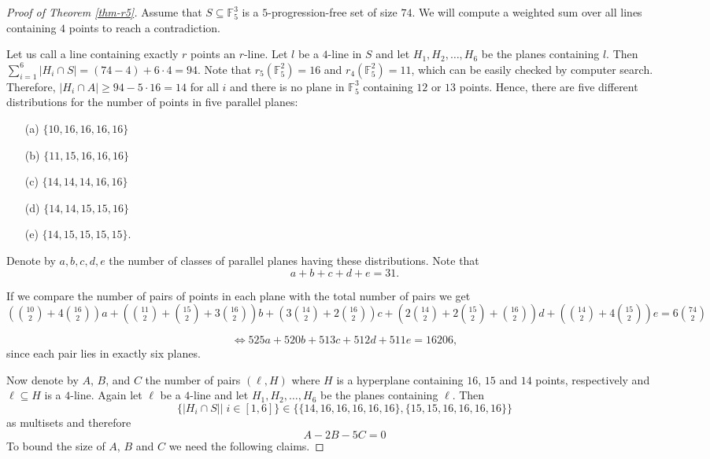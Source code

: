\documentclass[12pt]{amsart}
\newcommand{\<}{\langle}
\renewcommand{\>}{\rangle}
\numberwithin{equation}{section}
\numberwithin{theorem}{section}
\begin{document}
\begin{proof}[Proof of Theorem \ref{thm-r5}]
Assume that $S\subseteq \mathbb{F}_5^3$ is a $5$-progression-free set of size $74$. We will compute a weighted sum over all lines containing $4$ points to reach a contradiction.

Let us call a line containing exactly $r$ points an $r$-line. Let $l$ be a $4$-line in $S$ and let $H_1,H_2,\dots,H_6$ be the planes containing $l$. Then $\sum_{i=1}^6|H_i\cap S|=(74-4)+6\cdot 4=94$. Note that $r_5(\mathbb{F}_5^2)=16$ and $r_4(\mathbb{F}_5^2)=11$, which can be easily checked by computer search. Therefore, $|H_i\cap A|\geq 94-5\cdot 16=14$ for all $i$ and there is no plane in $\mathbb{F}_5^3$ containing $12$ or $13$ points.
Hence, there are five different distributions for the number of points in five parallel planes:
\begin{itemize}
    \item [(a)]$\{10,16,16,16,16\}$
    \item [(b)]$\{11,15,16,16,16\}$
    \item [(c)]$\{14,14,14,16,16\}$
    \item [(d)]$\{14,14,15,15,16\}$
    \item [(e)]$\{14,15,15,15,15\}.$
\end{itemize}
Denote by $a,b,c,d,e$ the number of classes of parallel planes having these distributions. Note that 
\begin{equation}\label{eq-sum}
a+b+c+d+e=31.
\end{equation}

If we compare the number of pairs of points in each plane with the total number of pairs we get $(\binom{10}{2}+4\binom{16}{2})a+(\binom{11}{2}+\binom{15}{2}+3\binom{16}{2})b+(3\binom{14}{2}+2\binom{16}{2})c+(2\binom{14}{2}+2\binom{15}{2}+\binom{16}{2})d+(\binom{14}{2}+4\binom{15}{2})e=6\binom{74}{2}$

\begin{equation}\label{eq-pairs}
\Leftrightarrow 525a+520b+513c+512d+511e=16206,
\end{equation}
since each pair lies in exactly six planes.

Now denote by $A$, $B$, and $C$ the number of pairs $(\ell,H)$ where $H$ is a hyperplane containing $16$, $15$ and $14$ points, respectively and $\ell\subseteq H$ is a $4$-line. Again let $\ell$ be a $4$-line and let $H_1,H_2,\dots,H_6$ be the planes containing $\ell$. Then $$\{\left| H_i\cap S\right| |\;i\in[1,6]\}\in\{\{14,16,16,16,16,16\},\{15,15,16,16,16,16\}\}$$ as multisets and therefore
\begin{equation}\label{eq-main}
A-2B-5C=0
\end{equation}
To bound the size of $A$, $B$ and $C$ we need the following claims.


\end{proof}
\end{document}
